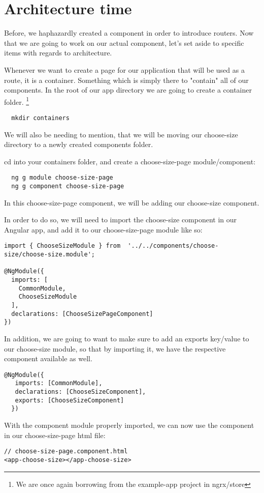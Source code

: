 \section{Architecture time}

Before, we haphazardly created a component in order to introduce routers. Now
that we are going to work on our actual component, let's set aside to specific
items with regards to architecture.

Whenever we want to create a page for our application that will be used as a
route, it is a container. Something which is simply there to "contain" all of
our components. In the root of our app directory we are going to create a
container folder. \footnote{We are once again borrowing from the example-app
project in ngrx/store}

\begin{verbatim}
  mkdir containers
\end{verbatim}
We will also be needing to mention, that we will be
moving our choose-size directory to a newly created components folder.

cd into your containers folder, and create a choose-size-page module/component:
\begin{verbatim}
  ng g module choose-size-page
  ng g component choose-size-page
\end{verbatim}

In this choose-size-page component, we will be adding our choose-size component.

In order to do so, we will need to import the choose-size component in our Angular
app, and add it to our choose-size-page module like so:

\begin{lstlisting}[caption=Importing the choose-size module]
import { ChooseSizeModule } from  '../../components/choose-size/choose-size.module';

@NgModule({
  imports: [
    CommonModule,
    ChooseSizeModule
  ],
  declarations: [ChooseSizePageComponent]
})
\end{lstlisting}

In addition, we are going to want to make sure to add an exports key/value to
our choose-size module, so that by importing it, we have the respective
component available as well.

\begin{lstlisting}[caption=Adding choose-size component as export]
  @NgModule({
   imports: [CommonModule],
   declarations: [ChooseSizeComponent],
   exports: [ChooseSizeComponent]
  })
\end{lstlisting}

With the component module properly imported, we can now use the component in our
choose-size-page html file:
\begin{verbatim}
// choose-size-page.component.html
<app-choose-size></app-choose-size>
\end{verbatim}
